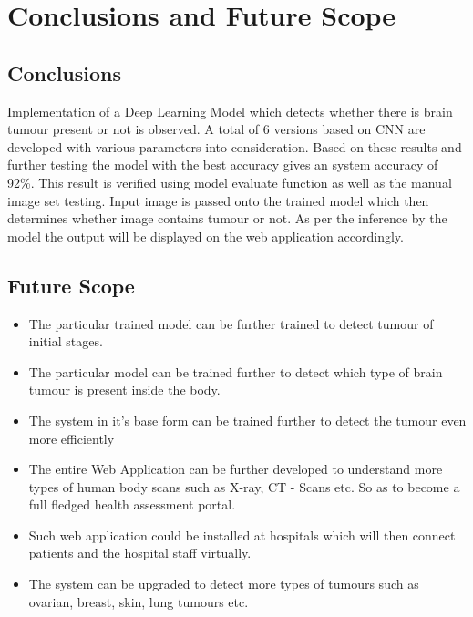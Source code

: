 \chapter{Conclusions and Future Scope}
\section{Conclusions }
Implementation of a Deep Learning Model which detects whether there is brain tumour present or not is observed. A total of 6 versions based on CNN are developed with various parameters into consideration. Based on these results and further testing the model with the best accuracy gives an system accuracy of 92\%. This result is verified using model evaluate function as well as the manual image set testing. Input image is passed onto the trained model which then determines whether image contains tumour or not. As per the inference by the model the output will be displayed on the web application accordingly.
\section{Future Scope }
\begin{itemize}
    \item The particular trained model can be further trained to detect tumour of initial stages.
    \item The particular model can be trained further to detect which type of brain tumour is present inside the body.
    \item The system in it’s base form can be trained further to detect the tumour even more efficiently
    \item The entire Web Application can be further developed to understand more types of human body scans such as X-ray, CT - Scans etc. So as to become a full fledged health assessment portal.
    \item Such web application could be installed at hospitals which will then connect patients and the hospital staff virtually.
    \item The system can be upgraded to detect more types of tumours such as ovarian, breast, skin, lung tumours etc.
\end{itemize}
